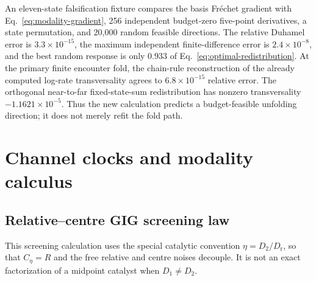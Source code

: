 \documentclass[aps,pre,reprint,amsmath,amssymb,longbibliography,floatfix]{revtex4-2}
\newcommand{\Dr}{D_{\mathrm r}}
\begin{document}
An eleven-state falsification fixture compares the basis Fr\'echet gradient
with Eq.~\eqref{eq:modality-gradient}, 256 independent budget-zero five-point
derivatives, a state permutation, and 20,000 random feasible directions. The
relative Duhamel error is \(3.3\times10^{-15}\), the maximum independent
finite-difference error is \(2.4\times10^{-8}\), and the best random response
is only \(0.933\) of Eq.~\eqref{eq:optimal-redistribution}. At the primary
finite encounter fold, the chain-rule reconstruction of the already computed
log-rate transversality agrees to \(6.8\times10^{-15}\) relative error. The
orthogonal near-to-far fixed-state-sum redistribution has nonzero
transversality \(-1.1621\times10^{-5}\). Thus the new calculation predicts a
budget-feasible unfolding direction; it does not merely refit the fold path.

\section{Channel clocks and modality calculus}
\label{sec:fold-theory}

\subsection{Relative--centre GIG screening law}
\label{sec:gig}

This screening calculation uses the special catalytic convention
\(\eta=D_2/\Dr\), so that \(C_\eta=R\) and the free relative and centre noises
decouple. It is not an exact factorization of a midpoint catalyst when
\(D_1\ne D_2\).
\end{document}
